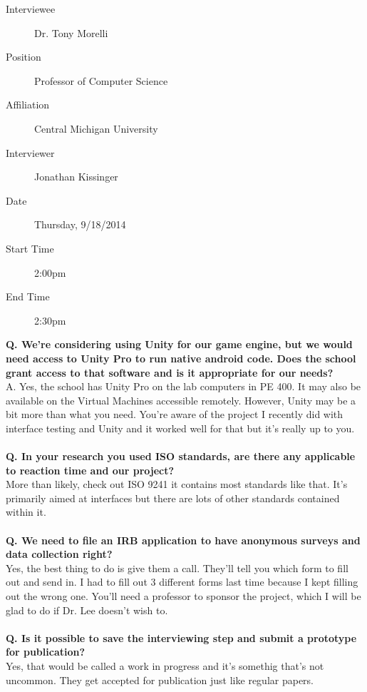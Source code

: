\documentclass[a4wide]{article}
\begin{document}
\begin{description}
\item[Interviewee] Dr. Tony Morelli
\item[Position] Professor of Computer Science
\item[Affiliation] Central Michigan University
\item[Interviewer] Jonathan Kissinger
\item[Date] Thursday, 9/18/2014
\item[Start Time] 2:00pm
\item[End Time] 2:30pm
\end{description}
\textbf{Q. We’re considering using Unity for our game engine, but we would need access to Unity Pro to run native android code.  Does the school grant access to that software and is it appropriate for our needs?}\\
A. Yes, the school has Unity Pro on the lab computers in PE 400.  It may also be available on the Virtual Machines accessible remotely.  However, Unity may be a bit more than what you need.  You’re aware of the project I recently did with interface testing and Unity and it worked well for that but it’s really up to you.\\\\
\textbf{Q. In your research you used ISO standards, are there any applicable to reaction time and our project?}\\
More than likely, check out ISO 9241 it contains most standards like that.  It’s primarily aimed at interfaces but there are lots of other standards contained within it.\\\\
\textbf{Q. We need to file an IRB application to have anonymous surveys and data collection right?}\\
Yes, the best thing to do is give them a call.  They’ll tell you which form to fill out and send in.  I had to fill out 3 different forms last time because I kept filling out the wrong one.  You’ll need a professor to sponsor the project, which I will be glad to do if Dr. Lee doesn’t wish to.\\\\
\textbf{Q. Is it possible to save the interviewing step and submit a prototype for publication?}\\
Yes, that would be called a work in progress and it's somethig that's not uncommon.  They get accepted for publication just like regular papers.
\end{document}
